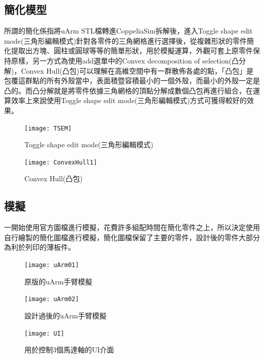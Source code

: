\subsection{簡化模型}
 所謂的簡化係指將uArm STL檔轉進CoppeliaSim拆解後，進入Toggle shape edit mode(三角形編輯模式)針對各零件的三角網格進行選擇後，從複雜形狀的零件簡化提取出方塊、圓柱或圓球等等的簡單形狀，用於模擬運算，外觀可套上原零件保持原樣，另一方式為使用add選單中的Convex decomposition of selection(凸分解)，Convex Hull(凸包)可以理解在高維空間中有一群散佈各處的點，「凸包」是包覆這群點的所有外殼當中，表面積暨容積最小的一個外殼，而最小的外殼一定是凸的。而凸分解就是將零件依據三角網格的頂點分解成數個凸包再進行組合，在運算效率上來說使用Toggle shape edit mode(三角形編輯模式)方式可獲得較好的效果。\\
 
\begin{figure}[hbt!]
\begin{center}
\texttt{[image: TSEM]}
\caption{\Large Toggle shape edit mode(三角形編輯模式)}\label{TSEM}
\end{center}
\end{figure}

\begin{figure}[hbt!]
\begin{center}
\texttt{[image: ConvexHull1]}
\caption{\Large Convex Hull(凸包)}\label{ConvexHull1}
\end{center}
\end{figure}

\subsection{模擬}
 一開始使用官方圖檔進行模擬，花費許多組配時間在簡化零件之上，所以決定使用自行繪製的簡化圖檔進行模擬，簡化圖檔保留了主要的零件，設計後的零件大部分為利於列印的薄板件。\\
\begin{figure}[hbt!]
\begin{center}
\texttt{[image: uArm01]}
\caption{\Large 原版的uArm手臂模擬}\label{uArm01}
\end{center}
\end{figure}
\begin{figure}[hbt!]
\begin{center}
\texttt{[image: uArm02]}
\caption{\Large 設計過後的uArm手臂模擬}\label{uArm02}
\end{center}
\end{figure}
\begin{figure}[hbt!]
\begin{center}
\texttt{[image: UI]}
\caption{\Large 用於控制3個馬達軸的UI介面}\label{UI}
\end{center}
\end{figure}
\newpage

